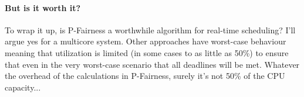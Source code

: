 \paragraph{But is it worth it?}
To wrap it up, is P-Fairness a worthwhile algorithm for real-time scheduling? I'll argue yes for a multicore system. Other approaches have worst-case behaviour meaning that utilization is limited (in some cases to as little as 50\%) to ensure that even in the very worst-case scenario that all deadlines will be met. Whatever the overhead of the calculations in P-Fairness, surely it's not 50\% of the CPU capacity...




